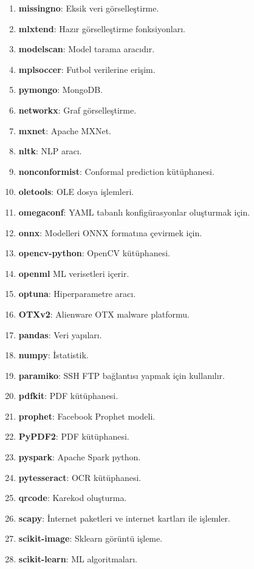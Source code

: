 \begin{enumerate}
    \item \textbf{missingno}: Eksik veri görselleştirme.
    \item \textbf{mlxtend}: Hazır görselleştirme fonksiyonları.
    \item \textbf{modelscan}: Model tarama aracıdır.
    \item \textbf{mplsoccer}: Futbol verilerine erişim.
    \item \textbf{pymongo}: MongoDB.
    \item \textbf{networkx}: Graf görselleştirme.
    \item \textbf{mxnet}: Apache MXNet.
    \item \textbf{nltk}: NLP aracı.
    \item \textbf{nonconformist}: Conformal prediction kütüphanesi.
    \item \textbf{oletools}: OLE dosya işlemleri.
    \item \textbf{omegaconf}: YAML tabanlı konfigürasyonlar oluşturmak için.
    \item \textbf{onnx}: Modelleri ONNX formatına çevirmek için.
    \item \textbf{opencv-python}: OpenCV kütüphanesi.
    \item \textbf{openml} ML verisetleri içerir.
    \item \textbf{optuna}: Hiperparametre aracı.
    \item \textbf{OTXv2}: Alienware OTX malware platformu.
    \item \textbf{pandas}: Veri yapıları.
    \item \textbf{numpy}: İstatistik.
    \item \textbf{paramiko}: SSH FTP bağlantısı yapmak için kullanılır.
    \item \textbf{pdfkit}: PDF kütüphanesi.
    \item \textbf{prophet}: Facebook Prophet modeli.
    \item \textbf{PyPDF2}: PDF kütüphanesi.
    \item \textbf{pyspark}: Apache Spark python.
    \item \textbf{pytesseract}: OCR kütüphanesi.
    \item \textbf{qrcode}: Karekod oluşturma.
    \item \textbf{scapy}: İnternet paketleri ve internet kartları ile işlemler.
    \item \textbf{scikit-image}: Sklearn görüntü işleme.
    \item \textbf{scikit-learn}: ML algoritmaları.

\end{enumerate}
